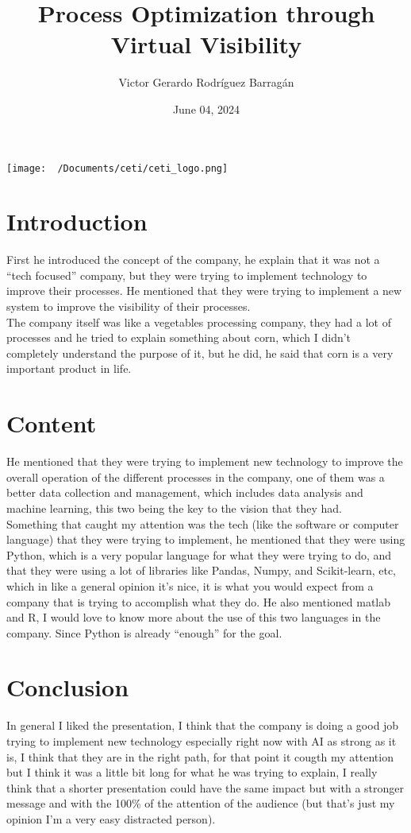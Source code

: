 \documentclass{article}
\title{Process Optimization through Virtual Visibility}
\author{Victor Gerardo Rodríguez Barragán}
\date{June 04, 2024}
\begin{document}
\maketitle
\texttt{[image: ~/Documents/ceti/ceti\_logo.png]}
\newpage
\justify
\section{Introduction}
First he introduced the concept of the company, he explain that it was not a ``tech focused''
company, but they were trying to implement technology to improve their processes. He mentioned
that they were trying to implement a new system to improve the visibility of their processes.
\vspace{0.5cm}\\
The company itself was like a vegetables processing company, they had a lot of processes and he
tried to explain something about corn, which I didn't completely understand the purpose of it, but
he did, he said that corn is a very important product in life.

\section{Content}
He mentioned that they were trying to implement new technology to improve the overall operation of
the different processes in the company, one of them was a better data collection and management, which
includes data analysis and machine learning, this two being the key to the vision that they had.
\vspace{0.5cm}\\
Something that caught my attention was the tech (like the software or computer language) that they were
trying to implement, he mentioned that they were using Python, which is a very popular language for
what they were trying to do, and that they were using a lot of libraries like Pandas, Numpy, and Scikit-learn, etc, which
in like a general opinion it's nice, it is what you would expect from a company that is trying to accomplish what
they do. He also mentioned matlab and R, I would love to know more about the use of this two languages in the company.
Since Python is already ``enough'' for the goal.

\section{Conclusion}
In general I liked the presentation, I think that the company is doing a good job trying to implement new technology
especially right now with AI as strong as it is, I think that they are in the right path, for that point it cougth my
attention but I think it was a little bit long for what he was trying to explain, I really think that a shorter presentation
could have the same impact but with a stronger message and with the 100\% of the attention of the audience (but that's just my opinion
I'm a very easy distracted person).
\end{document}
